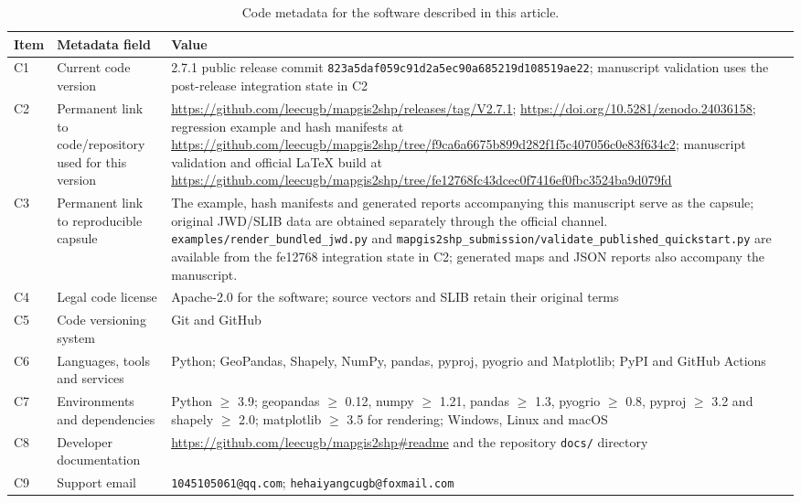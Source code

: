 \documentclass[preprint,12pt,numbers]{elsarticle}
\begin{document}
\begin{table}[htbp]
\centering
\caption{Code metadata for the software described in this article.}
\label{tab:code-metadata}
\footnotesize
\begin{tabular}{p{}p{}p{}}
\toprule
Item & Metadata field & Value \\
\midrule
C1 & Current code version & 2.7.1 public release commit \texttt{823a5daf059c91d2a5ec90a685219d108519ae22}; manuscript validation uses the post-release integration state in C2 \\
C2 & Permanent link to code/repository used for this version & \url{https://github.com/leecugb/mapgis2shp/releases/tag/V2.7.1}; \url{https://doi.org/10.5281/zenodo.24036158}; regression example and hash manifests at \url{https://github.com/leecugb/mapgis2shp/tree/f9ca6a6675b899d282f1f5c407056c0e83f634c2}; manuscript validation and official LaTeX build at \url{https://github.com/leecugb/mapgis2shp/tree/fe12768fc43dcec0f7416ef0fbc3524ba9d079fd} \\
C3 & Permanent link to reproducible capsule & The example, hash manifests and generated reports accompanying this manuscript serve as the capsule; original JWD/SLIB data are obtained separately through the official channel. \texttt{examples/render\_bundled\_jwd.py} and \texttt{mapgis2shp\_submission/validate\_published\_quickstart.py} are available from the fe12768 integration state in C2; generated maps and JSON reports also accompany the manuscript. \\
C4 & Legal code license & Apache-2.0 for the software; source vectors and SLIB retain their original terms \\
C5 & Code versioning system & Git and GitHub \\
C6 & Languages, tools and services & Python; GeoPandas, Shapely, NumPy, pandas, pyproj, pyogrio and Matplotlib; PyPI and GitHub Actions \\
C7 & Environments and dependencies & Python $\geq$ 3.9; geopandas $\geq$ 0.12, numpy $\geq$ 1.21, pandas $\geq$ 1.3, pyogrio $\geq$ 0.8, pyproj $\geq$ 3.2 and shapely $\geq$ 2.0; matplotlib $\geq$ 3.5 for rendering; Windows, Linux and macOS \\
C8 & Developer documentation & \url{https://github.com/leecugb/mapgis2shp#readme} and the repository \texttt{docs/} directory \\
C9 & Support email & \texttt{1045105061@qq.com}; \texttt{hehaiyangcugb@foxmail.com} \\
\bottomrule
\end{tabular}
\end{table}
\end{document}
